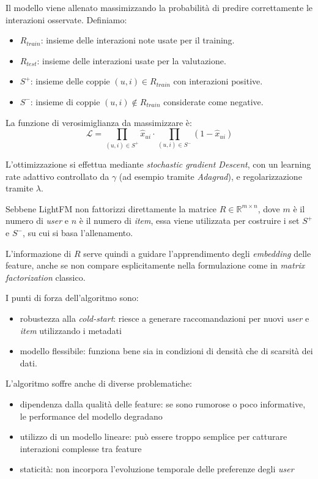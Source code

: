 Il modello viene allenato massimizzando la probabilità di predire correttamente le interazioni osservate. Definiamo:

\begin{itemize}
    \item $R_{train}$: insieme delle interazioni note usate per il training.
    \item $R_{test}$: insieme delle interazioni usate per la valutazione.
    \item $S^+$: insieme delle coppie $(u, i) \in R_{train}$ con interazioni positive.
    \item $S^-$: insieme di coppie $(u, i) \notin R_{train}$ considerate come negative.
\end{itemize}

La funzione di verosimiglianza da massimizzare è:
\[
\mathcal{L} = \prod_{(u,i) \in S^+} \hat{x}_{ui} \cdot \prod_{(u,i) \in S^-} (1 - \hat{x}_{ui})
\]

L'ottimizzazione si effettua mediante \textit{stochastic gradient Descent}, con un learning rate adattivo controllato da $\gamma$ (ad esempio tramite \textit{Adagrad}), e regolarizzazione tramite $\lambda$.

Sebbene LightFM non fattorizzi direttamente la matrice $R \in \mathbb{R}^{m \times n}$, dove $m$ è il numero di \textit{user} e $n$ è il numero di \textit{item}, essa viene utilizzata per costruire i set $S^+$ e $S^-$, su cui si basa l'allenamento.

L'informazione di $R$ serve quindi a guidare l'apprendimento degli \textit{embedding} delle feature, anche se non compare esplicitamente nella formulazione come in \textit{matrix factorization} classico.

I punti di forza dell'algoritmo sono:

\begin{itemize}
    \item robustezza alla \textit{cold-start}: riesce a generare raccomandazioni per nuovi \textit{user} e \textit{item} utilizzando i metadati
    \item modello flessibile: funziona bene sia in condizioni di densità che di scarsità dei dati.
\end{itemize}

L'algoritmo soffre anche di diverse problematiche:

\begin{itemize}
    \item dipendenza dalla qualità delle feature: se sono rumorose o poco informative, le performance del modello degradano
    \item utilizzo di un modello lineare: può essere troppo semplice per catturare interazioni complesse tra feature
    \item staticità: non incorpora l'evoluzione temporale delle preferenze degli \textit{user}
\end{itemize}

